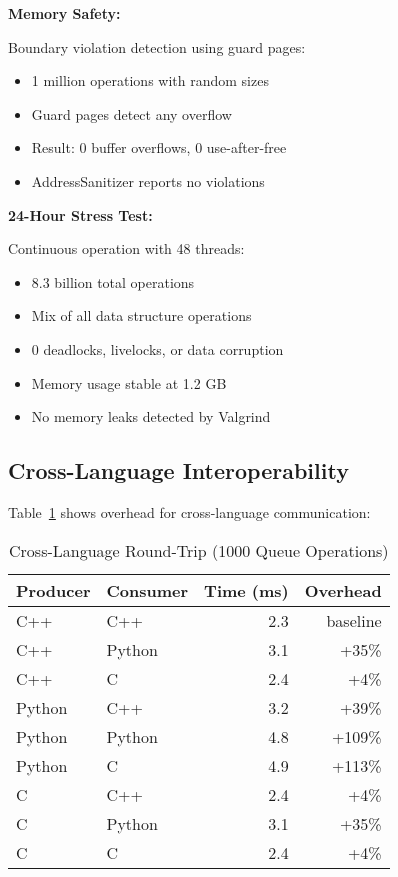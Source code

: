 \documentclass[11pt]{article}
\begin{document}
\textbf{Memory Safety:}

Boundary violation detection using guard pages:

\begin{itemize}
\item 1 million operations with random sizes
\item Guard pages detect any overflow
\item Result: 0 buffer overflows, 0 use-after-free
\item AddressSanitizer reports no violations
\end{itemize}

\textbf{24-Hour Stress Test:}

Continuous operation with 48 threads:

\begin{itemize}
\item 8.3 billion total operations
\item Mix of all data structure operations
\item 0 deadlocks, livelocks, or data corruption
\item Memory usage stable at 1.2 GB
\item No memory leaks detected by Valgrind
\end{itemize}

\subsection{Cross-Language Interoperability}

Table~\ref{tab:interop} shows overhead for cross-language communication:

\begin{table}[h]
\centering
\caption{Cross-Language Round-Trip (1000 Queue Operations)}
\label{tab:interop}
\begin{tabular}{llrr}
\toprule
Producer & Consumer & Time (ms) & Overhead \\
\midrule
C++ & C++ & 2.3 & baseline \\
C++ & Python & 3.1 & +35\% \\
C++ & C & 2.4 & +4\% \\
Python & C++ & 3.2 & +39\% \\
Python & Python & 4.8 & +109\% \\
Python & C & 4.9 & +113\% \\
C & C++ & 2.4 & +4\% \\
C & Python & 3.1 & +35\% \\
C & C & 2.4 & +4\% \\
\bottomrule
\end{tabular}
\end{table}
\end{document}
